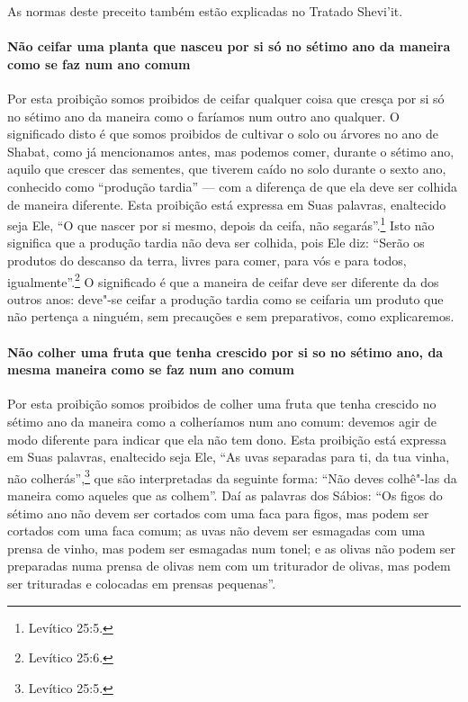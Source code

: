 \begin{multicols}{2}
As normas deste preceito também estão explicadas no Tratado Shevi'it\starr.

\paragraph{Não ceifar uma planta que nasceu por si só no sétimo ano da maneira
como se faz num ano comum}

Por esta proibição somos proibidos de ceifar qualquer coisa que cresça
por si só no sétimo ano da maneira como o faríamos num outro ano
qualquer. O significado disto é que somos proibidos de cultivar o solo
ou árvores no ano de Shabat, como já mencionamos antes, mas podemos
comer, durante o sétimo ano, aquilo que crescer das sementes, que
tiverem caído no solo durante o sexto ano, conhecido como ``produção
tardia'' --- com a diferença de que ela deve ser colhida de maneira
diferente. Esta proibição está expressa em Suas palavras, enaltecido
seja Ele, ``O que nascer por si mesmo, depois da ceifa, não segarás''.\footnote{Levítico 25:5.} Isto não significa que a produção tardia não deva ser
colhida, pois Ele diz: ``Serão os produtos do descanso da terra, livres
para comer, para vós e para todos, igualmente''.\footnote{Levítico 25:6.} O
significado é que a maneira de ceifar deve ser diferente da dos outros
anos: deve"-se ceifar a produção tardia como se ceifaria um produto que
não pertença a ninguém, sem precauções e sem preparativos, como
explicaremos.

\paragraph{Não colher uma fruta que tenha crescido por si so no sétimo ano, da
mesma maneira como se faz num ano comum}

Por esta proibição somos proibidos de colher uma fruta que tenha
crescido no sétimo ano da maneira como a colheríamos num ano comum: devemos agir de modo diferente para indicar que ela não tem dono. Esta
proibição está expressa em Suas palavras, enaltecido seja Ele, ``As
uvas separadas para ti, da tua vinha, não colherás'',\footnote{Levítico 25:5.}
que são interpretadas da seguinte forma: ``Não deves colhê"-las da
maneira como aqueles que as colhem''. Daí as palavras dos Sábios: ``Os
figos do sétimo ano não devem ser cortados com uma faca para figos, mas
podem ser cortados com uma faca comum; as uvas não devem ser esmagadas
com uma prensa de vinho, mas podem ser esmagadas num tonel; e as olivas
não podem ser preparadas numa prensa de olivas nem com um triturador de
olivas, mas podem ser trituradas e colocadas em prensas pequenas''.


\end{multicols}
